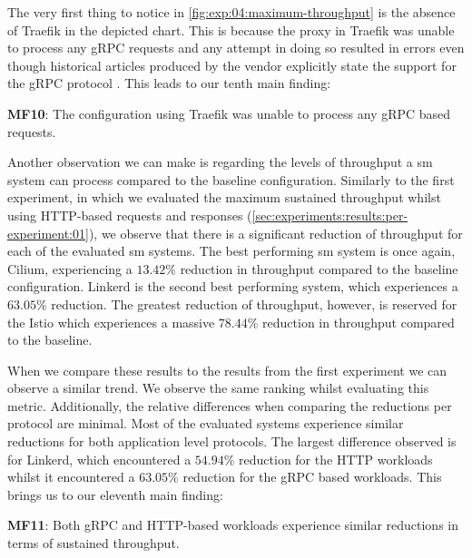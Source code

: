 The very first thing to notice in \cref{fig:exp:04:maximum-throughput} is the absence of Traefik in the depicted chart. This is because the proxy in Traefik was unable to process any gRPC requests and any attempt in doing so resulted in errors even though historical articles produced by the vendor explicitly state the support for the gRPC protocol \cite{maesh-introduction}. This leads to our tenth main finding:

\begin{shaded*}
    \noindent
    \textbf{MF10}:
    The configuration using Traefik was unable to process any gRPC based requests.
\end{shaded*}


Another observation we can make is regarding the levels of throughput a \gls{sm} system can process compared to the baseline configuration. Similarly to the first experiment, in which we evaluated the maximum sustained throughput whilst using HTTP-based requests and responses (\cref{sec:experiments:results:per-experiment:01}), we observe that there is a significant reduction of throughput for each of the evaluated \gls{sm} systems. The best performing \gls{sm} system is once again, Cilium, experiencing a $13.42\%$ reduction in throughput compared to the baseline configuration. Linkerd is the second best performing system, which experiences a $63.05\%$ reduction. The greatest reduction of throughput, however, is reserved for the Istio which experiences a massive $78.44\%$ reduction in throughput compared to the baseline.

When we compare these results to the results from the first experiment we can observe a similar trend. We observe the same ranking whilst evaluating this metric. Additionally, the relative differences when comparing the reductions per protocol are minimal. Most of the evaluated systems experience similar reductions for both application level protocols. The largest difference observed is for Linkerd, which encountered a $54.94\%$ reduction for the HTTP workloads whilst it encountered a $63.05\%$ reduction for the gRPC based workloads. This brings us to our eleventh main finding:

\begin{shaded*}
    \noindent
    \textbf{MF11}:
    Both gRPC and HTTP-based workloads experience similar reductions in terms of sustained throughput.
\end{shaded*}


